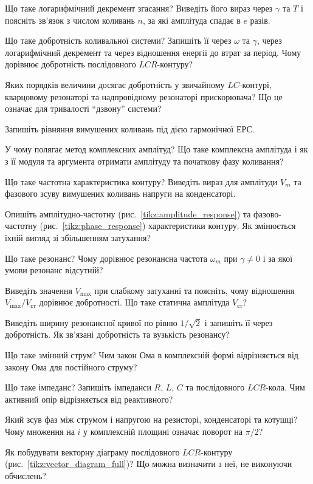 \begin{Questions}
\begin{quizlist}
	\item Що таке логарифмічний декремент згасання? Виведіть його вираз через $\gamma$ та $T$ і поясніть зв'язок з числом коливань $n$, за які амплітуда спадає в $e$ разів.
	\item Що таке добротність коливальної системи? Запишіть її через $\omega$ та $\gamma$, через логарифмічний декремент та через відношення енергії до втрат за період. Чому дорівнює добротність послідовного $LCR$-контуру?
	\item Яких порядків величини досягає добротність у звичайному $LC$-контурі, кварцовому резонаторі та надпровідному резонаторі прискорювача? Що це означає для тривалості \enquote{дзвону} системи?
	\item Запишіть рівняння вимушених коливань під дією гармонічної ЕРС.
	\item У чому полягає метод комплексних амплітуд? Що таке комплексна амплітуда і як з її модуля та аргумента отримати амплітуду та початкову фазу коливання?
	\item Що таке частотна характеристика контуру? Виведіть вираз для амплітуди $V_m$ та фазового зсуву вимушених коливань напруги на конденсаторі.
	\item Опишіть амплітудно-частотну (рис.~\ref{tikz:amplitude_response}) та фазово-частотну (рис.~\ref{tikz:phase_response}) характеристики контуру. Як змінюється їхній вигляд зі збільшенням затухання?
	\item Що таке резонанс? Чому дорівнює резонансна частота $\omega_m$ при $\gamma\ne0$ і за якої умови резонанс відсутній?
	\item Виведіть значення $V_{\max}$ при слабкому затуханні та поясніть, чому відношення $V_{\max}/V_{\text{ст}}$ дорівнює добротності. Що таке статична амплітуда $V_{\text{ст}}$?
	\item Виведіть ширину резонансної кривої по рівню $1/\sqrt2$ і запишіть її через добротність. Як зв'язані добротність та вузькість резонансу?
	\item Що таке змінний струм? Чим закон Ома в комплексній формі відрізняється від закону Ома для постійного струму?
	\item Що таке імпеданс? Запишіть імпеданси $R$, $L$, $C$ та послідовного $LCR$-кола. Чим активний опір відрізняється від реактивного?
	\item Який зсув фаз між струмом і напругою на резисторі, конденсаторі та котушці? Чому множення на $i$ у комплексній площині означає поворот на $\pi/2$?
	\item Як побудувати векторну діаграму послідовного $LCR$-контуру (рис.~\ref{tikz:vector_diagram_full})? Що можна визначити з неї, не виконуючи обчислень?

\end{quizlist}
\end{Questions}
